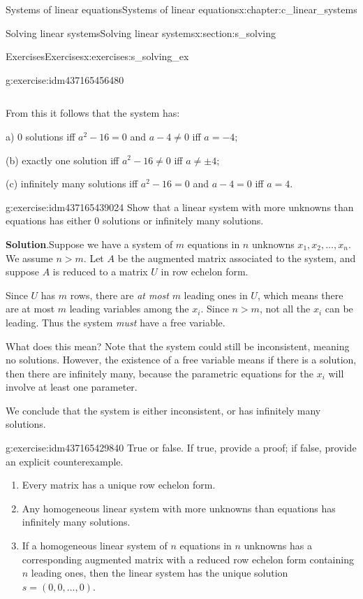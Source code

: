 \documentclass[oneside,10pt,]{book}
\newcommand{\blocktitlefont}{\relax}
\numberwithin{equation}{section}
\begin{document}
\begin{chapterptx}{Systems of linear equations}{}{Systems of linear equations}{}{}{x:chapter:c_linear_systems}
\begin{sectionptx}{Solving linear systems}{}{Solving linear systems}{}{}{x:section:s_solving}
\begin{exercises-subsection-numberless}{Exercises}{}{Exercises}{}{}{x:exercises:s_solving_ex}
\begin{divisionexercise}{6}{}{}{g:exercise:idm437165456480}
\begin{enumerate}[marker=(\alph*)]
\begin{equation*}
\end{equation*}
%
\par
From this it follows that the system has:%
\par
a) 0 solutions iff \(a^2-16=0\) and \(a-4\ne 0\) iff \(a=-4\);%
\par
(b) exactly one solution iff \(a^2-16\ne 0\) iff \(a\ne\pm 4\);%
\par
(c) infinitely many solutions iff \(a^2-16=0\) and \(a-4=0\) iff \(a=4\).%
\end{enumerate}
%
\end{divisionexercise}%
\begin{divisionexercise}{7}{}{}{g:exercise:idm437165439024}%
Show that a linear system with more unknowns than equations has  either 0 solutions or infinitely many solutions.%
\par\smallskip%
\noindent\textbf{\blocktitlefont Solution}.\hypertarget{g:solution:idm437165438384}{}\quad{}Suppose we have a system of \(m\) equations in \(n\) unknowns \(x_1,x_2,\dots, x_n\). We assume \(n>m\). Let \(A\) be the augmented matrix associated to the system, and suppose \(A\) is reduced to a matrix \(U\) in row echelon form.%
\par
Since \(U\) has \(m\) rows, there are \emph{at most} \(m\) leading ones in \(U\), which means there are at most \(m\) leading variables among the \(x_i\). Since \(n>m\), not all the \(x_i\) can be leading. Thus the system \emph{must} have a free variable.%
\par
What does this mean? Note that the system could still be inconsistent, meaning no solutions. However, the existence of a free variable means if there is a solution, then there are infinitely many, because the parametric equations for the \(x_i\) will involve at least one parameter.%
\par
We conclude that the system is either inconsistent, or has infinitely many solutions.%
\end{divisionexercise}%
\begin{divisionexercise}{8}{}{}{g:exercise:idm437165429840}%
True or false. If true, provide a proof; if false, provide an explicit counterexample.%
%
\begin{enumerate}[marker=(\alph*)]
\item{}Every matrix has a unique row echelon form.%
\item{}Any homogeneous linear system with more unknowns than equations has infinitely many solutions.%
\item{}If a homogeneous linear system of \(n\) equations in \(n\) unknowns has a corresponding augmented matrix with a reduced row echelon form containing \(n\) leading ones, then the linear system has the unique solution \(s=(0,0,\dots, 0)\).%

\end{enumerate}
\end{divisionexercise}
\end{exercises-subsection-numberless}
\end{sectionptx}
\end{chapterptx}
\end{document}
